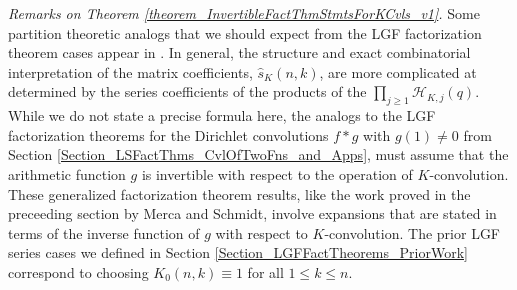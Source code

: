 \documentclass[12pt,reqno,a4letter]{article}
\numberwithin{figure}{section}
\numberwithin{table}{section}
\numberwithin{equation}{section}
\theoremstyle{plain}
\numberwithin{theorem}{section}
\theoremstyle{definition}
\begin{document}
\emph{Remarks on Theorem \ref{theorem_InvertibleFactThmStmtsForKCvls_v1}.} 
Some partition theoretic analogs that we should expect from the LGF factorization 
theorem cases appear in \cite[\S 14.10]{APOSTOLANUMT}. In general, the structure and exact combinatorial 
interpretation of the matrix coefficients, $\hat{s}_K(n, k)$, are more complicated at determined by the 
series coefficients of the products of the $\prod_{j \geq 1} \mathcal{H}_{K,j}(q)$. 
While we do not state a precise formula here, the analogs to the LGF factorization theorems for 
the Dirichlet convolutions $f \ast g$ with $g(1) \neq 0$ from 
Section \ref{Section_LSFactThms_CvlOfTwoFns_and_Apps}, 
must assume that the arithmetic function $g$ is invertible with respect to the operation of $K$-convolution. 
These generalized factorization theorem results, like the work proved in the preceeding section by Merca and Schmidt, 
involve expansions that are stated in terms of the inverse function of $g$ with respect to $K$-convolution. 
The prior LGF series cases we defined in 
Section \ref{Section_LGFFactTheorems_PriorWork}
correspond to choosing $K_0(n, k) \equiv 1$ for all $1 \leq k \leq n$. 
\end{document}
